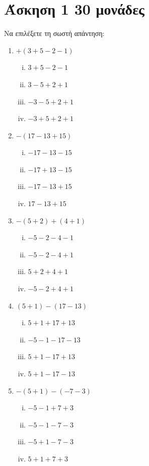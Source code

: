 \documentclass[a4paper,10pt]{report}
\begin{document}
\section*{Άσκηση 1  \hfill \small{30 μονάδες}}
Να επιλέξετε τη σωστή απάντηση:
\begin{enumerate}[1)]
 \item $+(3+5-2-1)$    %
\begin{multicols}{4}
\begin{enumerate}[i)]
 \item $3+5-2-1$
 \item $3-5+2+1$
 \item $-3-5+2+1$
 \item $-3+5+2+1$
\end{enumerate}
\end{multicols}
 \item $-(17-13+15)$    %
\begin{multicols}{4}
\begin{enumerate}[i)]
 \item $-17-13-15$
 \item $-17+13-15$
 \item $-17-13+15$
 \item $17-13+15$
\end{enumerate}
\end{multicols}
 \item $-(5+2)+(4+1)$    %
\begin{multicols}{4}
\begin{enumerate}[i)]
 \item $-5-2-4-1$
 \item $-5-2-4+1$
 \item $5+2+4+1$
 \item $-5-2+4+1$
\end{enumerate}
\end{multicols}
 \item $(5+1)-(17-13)$    %
\begin{multicols}{4}
\begin{enumerate}[i)]
 \item $5+1+17+13$
 \item $-5-1-17-13$
 \item $5+1-17+13$
 \item $5+1-17-13$
\end{enumerate}
\end{multicols}
 \item $-(5+1)-(-7-3)$    %
\begin{multicols}{4}
\begin{enumerate}[i)]
 \item $-5-1+7+3$
 \item $-5-1-7-3$
 \item $-5+1-7-3$
 \item $5+1+7+3$
\end{enumerate}
\end{multicols}
\end{enumerate}
\end{document}
